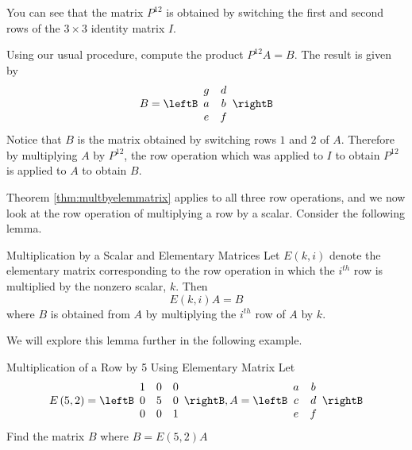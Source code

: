 \begin{solution}
You can see that the matrix $P^{12}$ is obtained by switching the first and second rows of the $3 \times 3$ identity matrix $I$.

Using our usual procedure, compute the product $P^{12}A = B$. The result is given by
\begin{equation*}
B =\leftB
\begin{array}{cc}
g & d \\
a & b \\
e & f
\end{array}
\rightB
\end{equation*}
Notice that $B$ is the matrix obtained by switching rows $1$ and $2$ of $A$. Therefore by  multiplying 
$A$ by $P^{12}$, the row operation which was applied to $I$ to obtain $P^{12}$ is applied to $A$ to obtain $B$. 
\end{solution}

Theorem \ref{thm:multbyelemmatrix} applies to all three row operations, and we now 
look at the row operation of multiplying a row by a scalar.  Consider the following lemma.

\begin{lemma}{Multiplication by a Scalar and Elementary Matrices}\label{lem:elemmatrixmultbyscalar}
Let $E\left( k,i\right) $ denote the elementary matrix
corresponding to the row operation in which the $i^{th}$ row is multiplied
by the nonzero scalar, $k.$  Then
\begin{equation*}
E\left( k,i\right) A=B
\end{equation*}
where $B$ is obtained from $A$ by multiplying the $i^{th}$ row of $A$ by $k$.
\end{lemma}

We will explore this lemma further in the following example.

\begin{example}{Multiplication of a Row by 5 Using Elementary Matrix}\label{exa:elemmatrixmultbyscalar}
Let
\begin{equation*}
E \left(5, 2\right) = \leftB
\begin{array}{rrr}
1 & 0 & 0 \\
0 & 5 & 0 \\
0 & 0 & 1
\end{array}
\rightB, A =  \leftB
\begin{array}{cc}
a & b \\
c & d \\
e & f
\end{array}
\rightB
\end{equation*}
Find the matrix $B$ where $B = E \left(5, 2\right)A$
\end{example}

